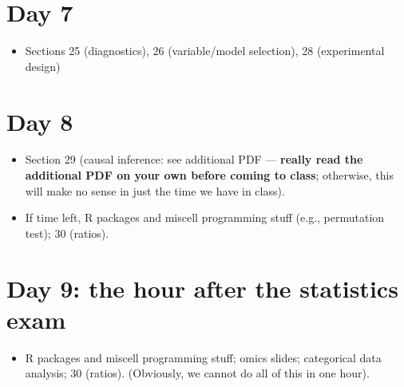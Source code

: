 \documentclass[12pt]{article}
\begin{document}
\section*{Day 7 }
\label{sec:org2142285}
\begin{itemize}
\item Sections 25 (diagnostics), 26 (variable/model selection), 28 (experimental design)
\end{itemize}
\section*{Day 8 }
\label{sec:org3d49cf0}
\begin{itemize}
\item Section 29 (causal inference: see additional PDF --- \textbf{really read the additional PDF on your own before coming to class}; otherwise, this will make no sense in just the time we have in class).
\item If time left,  R packages and miscell programming stuff (e.g., permutation test); 30 (ratios).
\end{itemize}
\section*{Day 9: the hour after the statistics exam}
\begin{itemize}
\item R packages and miscell programming stuff; omics slides; categorical data analysis; 30 (ratios). (Obviously, we cannot do all of this in one hour).
\end{itemize}
\label{sec:org32ab79d}
\end{document}
